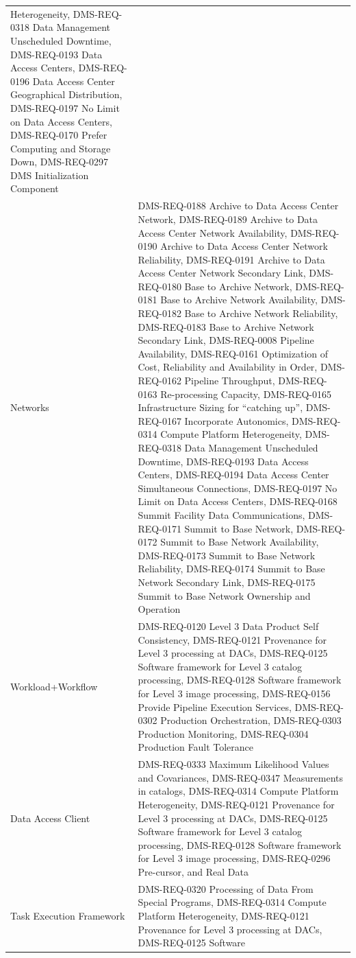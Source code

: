 \documentclass[]{article}
\begin{document}
\begin{longtable}[]{@{}ll@{}}
Heterogeneity, DMS-REQ-0318 Data Management Unscheduled Downtime,
DMS-REQ-0193 Data Access Centers, DMS-REQ-0196 Data Access Center
Geographical Distribution, DMS-REQ-0197 No Limit on Data Access Centers,
DMS-REQ-0170 Prefer Computing and Storage Down, DMS-REQ-0297 DMS
Initialization Component\tabularnewline
Networks & DMS-REQ-0188 Archive to Data Access Center Network,
DMS-REQ-0189 Archive to Data Access Center Network Availability,
DMS-REQ-0190 Archive to Data Access Center Network Reliability,
DMS-REQ-0191 Archive to Data Access Center Network Secondary Link,
DMS-REQ-0180 Base to Archive Network, DMS-REQ-0181 Base to Archive
Network Availability, DMS-REQ-0182 Base to Archive Network Reliability,
DMS-REQ-0183 Base to Archive Network Secondary Link, DMS-REQ-0008
Pipeline Availability, DMS-REQ-0161 Optimization of Cost, Reliability
and Availability in Order, DMS-REQ-0162 Pipeline Throughput,
DMS-REQ-0163 Re-processing Capacity, DMS-REQ-0165 Infrastructure Sizing
for ``catching up'', DMS-REQ-0167 Incorporate Autonomics, DMS-REQ-0314
Compute Platform Heterogeneity, DMS-REQ-0318 Data Management Unscheduled
Downtime, DMS-REQ-0193 Data Access Centers, DMS-REQ-0194 Data Access
Center Simultaneous Connections, DMS-REQ-0197 No Limit on Data Access
Centers, DMS-REQ-0168 Summit Facility Data Communications, DMS-REQ-0171
Summit to Base Network, DMS-REQ-0172 Summit to Base Network
Availability, DMS-REQ-0173 Summit to Base Network Reliability,
DMS-REQ-0174 Summit to Base Network Secondary Link, DMS-REQ-0175 Summit
to Base Network Ownership and Operation\tabularnewline
Workload+Workflow & DMS-REQ-0120 Level 3 Data Product Self Consistency,
DMS-REQ-0121 Provenance for Level 3 processing at DACs, DMS-REQ-0125
Software framework for Level 3 catalog processing, DMS-REQ-0128 Software
framework for Level 3 image processing, DMS-REQ-0156 Provide Pipeline
Execution Services, DMS-REQ-0302 Production Orchestration, DMS-REQ-0303
Production Monitoring, DMS-REQ-0304 Production Fault
Tolerance\tabularnewline
Data Access Client & DMS-REQ-0333 Maximum Likelihood Values and
Covariances, DMS-REQ-0347 Measurements in catalogs, DMS-REQ-0314 Compute
Platform Heterogeneity, DMS-REQ-0121 Provenance for Level 3 processing
at DACs, DMS-REQ-0125 Software framework for Level 3 catalog processing,
DMS-REQ-0128 Software framework for Level 3 image processing,
DMS-REQ-0296 Pre-cursor, and Real Data\tabularnewline
Task Execution Framework & DMS-REQ-0320 Processing of Data From Special
Programs, DMS-REQ-0314 Compute Platform Heterogeneity, DMS-REQ-0121
Provenance for Level 3 processing at DACs, DMS-REQ-0125 Software

\end{longtable}
\end{document}
